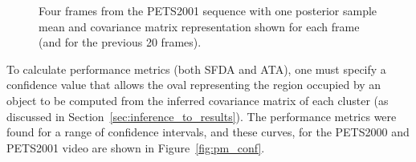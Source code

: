 \documentclass[twocolumn, final]{svjour3}
\begin{document}
\begin{figure}
  \centering               
   \hspace{1pt}
   \hspace{1pt}
   \hspace{1pt}
  \caption{Four frames from the PETS2001 sequence with one posterior sample mean and covariance matrix representation shown for each frame (and for the previous 20 frames).}
  \label{fig:pets2001_overlay}
\end{figure}

To calculate performance metrics (both SFDA and ATA), one must specify a confidence value that allows the oval representing the region occupied by an object to be computed from the inferred covariance matrix of each cluster (as discussed in Section~\ref{sec:inference_to_results}). The performance metrics were found for a range of confidence intervals, and these curves, for the PETS2000 and PETS2001 video are shown in Figure~\ref{fig:pm_conf}.
\end{document}
